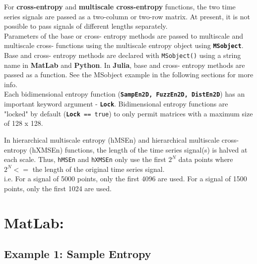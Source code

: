 \documentclass[12pt, a4paper, titlepage, openany]{book}
\begin{document}
\begin{tcolorbox}[sharp corners, colback=ehone!10, colframe=ehone, title=\textbf{THINGS TO REMEMBER}, label={BiBox}]

For \textbf{cross-entropy} and \textbf{multiscale cross-entropy} functions, the two time series signals are passed as a two-column or two-row matrix. At present, it is not possible to pass signals of different lengths separately.\\
\newline
Parameters of the base or cross- entropy methods are passed to multiscale and multiscale cross- functions using the multiscale entropy object using \texttt{\textbf{MSobject}}.\\
Base and cross- entropy methods are declared with \texttt{MSobject()} using a string name in \textbf{MatLab} and \textbf{Python}. In \textbf{Julia}, base and cross- entropy methods are passed as a function. See the MSobject example in the following sections for more info.\\
\newline
Each bidimensional entropy function (\texttt{\textbf{SampEn2D, FuzzEn2D, DistEn2D}}) has an important keyword argument - \texttt{\textbf{Lock}}. Bidimensional entropy functions are "locked" by default (\texttt{\textbf{Lock} == true}) to only permit matrices with a maximum size of 128 x 128.\\ \newline

In hierarchical multiscale entropy (hMSEn) and hierarchical multiscale cross-entropy (hXMSEn) functions, the length of the time series signal(s) is halved at each scale. Thus, \texttt{hMSEn} and \texttt{hXMSEn} only use the first $2^N$ data points where  $2^N <=$ the length of the original time series signal.\\
i.e. For a signal of 5000 points, only the first 4096 are used. For a signal of 1500 points, only the first 1024 are used.
\end{tcolorbox}







\newpage
\section{MatLab:}
\subsection{\normalsize Example 1: \hspace{15mm} Sample Entropy}
\end{document}

